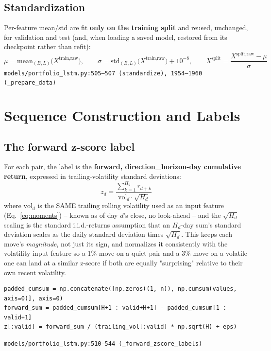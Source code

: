 \documentclass[11pt]{article}
\newcommand{\srcref}[1]{\hfill\textcolor{cmtcolor}{\footnotesize\texttt{#1}}}
\begin{document}
\subsection{Standardization}

Per-feature mean/std are fit \textbf{only on the training split} and reused, unchanged, for
validation and test (and, when loading a saved model, restored from its checkpoint rather
than refit):
\begin{equation}
  \mu = \mathrm{mean}_{(B,L)}\big(X^{\text{train,raw}}\big),\qquad
  \sigma = \mathrm{std}_{(B,L)}\big(X^{\text{train,raw}}\big) + 10^{-8},\qquad
  X^{\text{split}} = \frac{X^{\text{split,raw}} - \mu}{\sigma}
  \label{eq:standardize}
\end{equation}
\srcref{models/portfolio\_lstm.py:505--507 (\texttt{standardize}), 1954--1960 (\texttt{\_prepare\_data})}

\section{Sequence Construction and Labels}
\label{sec:labels}

\subsection{The forward z-score label}

For each pair, the label is the \textbf{forward, direction\_horizon-day cumulative return},
expressed in trailing-volatility standard deviations:
\begin{equation}
  z_d = \frac{\sum_{k=1}^{H_d} r_{d+k}}{\text{vol}_d \cdot \sqrt{H_d}}
  \label{eq:zlabel}
\end{equation}
where $\text{vol}_d$ is the SAME trailing rolling volatility used as an input feature
(Eq.~\ref{eq:moments}) -- known as of day $d$'s close, no look-ahead -- and the $\sqrt{H_d}$
scaling is the standard i.i.d.-returns assumption that an $H_d$-day sum's standard deviation
scales as the daily standard deviation times $\sqrt{H_d}$. This keeps each move's
\emph{magnitude}, not just its sign, and normalizes it consistently with the volatility
input feature so a 1\% move on a quiet pair and a 3\% move on a volatile one can land at a
similar z-score if both are equally "surprising" relative to their own recent volatility.
\begin{lstlisting}[caption={Vectorized forward z-score label via a cumulative-sum trick.}, label=lst:zlabel]
padded_cumsum = np.concatenate([np.zeros((1, n)), np.cumsum(values, axis=0)], axis=0)
forward_sum = padded_cumsum[H+1 : valid+H+1] - padded_cumsum[1 : valid+1]
z[:valid] = forward_sum / (trailing_vol[:valid] * np.sqrt(H) + eps)
\end{lstlisting}
\srcref{models/portfolio\_lstm.py:510--544 (\texttt{\_forward\_zscore\_labels})}
\end{document}
